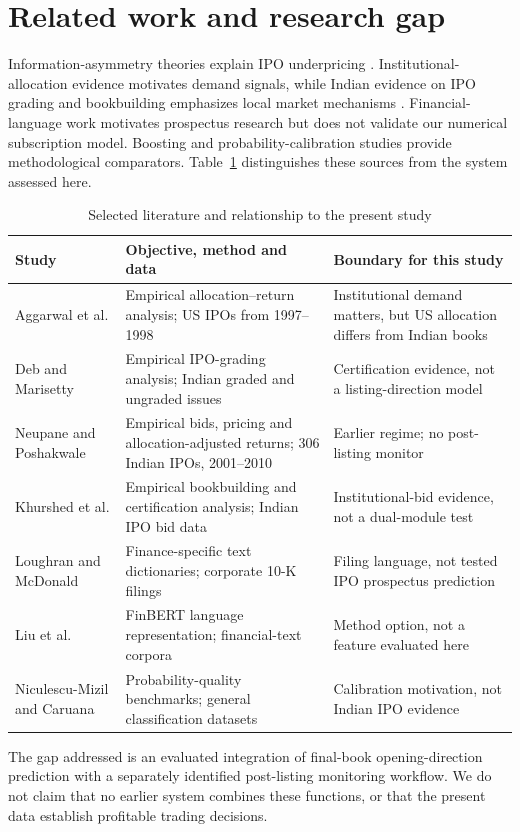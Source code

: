\documentclass[runningheads]{llncs}
\begin{document}
\section{Related work and research gap}
Information-asymmetry theories explain IPO underpricing \cite{ref1,ref2}. Institutional-allocation evidence \cite{ref3} motivates demand signals, while Indian evidence on IPO grading and bookbuilding emphasizes local market mechanisms \cite{ref4,ref5,ref6}. Financial-language work \cite{ref7,ref8} motivates prospectus research but does not validate our numerical subscription model. Boosting \cite{ref9,ref10} and probability-calibration studies \cite{ref11} provide methodological comparators. Table~\ref{tab:literature} distinguishes these sources from the system assessed here.
\begin{table}[tb]
\caption{Selected literature and relationship to the present study}\label{tab:literature}
\centering\small
\begin{tabular}{@{}>{\raggedright\arraybackslash}p{.20\linewidth}>{\raggedright\arraybackslash}p{.40\linewidth}>{\raggedright\arraybackslash}p{.31\linewidth}@{}}
\toprule Study & Objective, method and data & Boundary for this study\\\midrule
Aggarwal et al. \cite{ref3} & Empirical allocation--return analysis; US IPOs from 1997--1998 & Institutional demand matters, but US allocation differs from Indian books\\
Deb and Marisetty \cite{ref4} & Empirical IPO-grading analysis; Indian graded and ungraded issues & Certification evidence, not a listing-direction model\\
Neupane and Poshakwale \cite{ref5} & Empirical bids, pricing and allocation-adjusted returns; 306 Indian IPOs, 2001--2010 & Earlier regime; no post-listing monitor\\
Khurshed et al. \cite{ref6} & Empirical bookbuilding and certification analysis; Indian IPO bid data & Institutional-bid evidence, not a dual-module test\\
Loughran and McDonald \cite{ref7} & Finance-specific text dictionaries; corporate 10-K filings & Filing language, not tested IPO prospectus prediction\\
Liu et al. \cite{ref8} & FinBERT language representation; financial-text corpora & Method option, not a feature evaluated here\\
Niculescu-Mizil and Caruana \cite{ref11} & Probability-quality benchmarks; general classification datasets & Calibration motivation, not Indian IPO evidence\\\bottomrule
\end{tabular}
\end{table}
The gap addressed is an evaluated integration of final-book opening-direction prediction with a separately identified post-listing monitoring workflow. We do not claim that no earlier system combines these functions, or that the present data establish profitable trading decisions.
\end{document}
